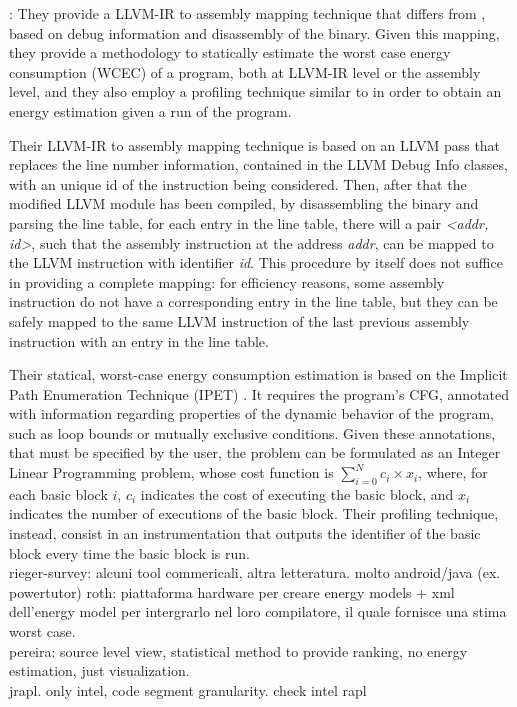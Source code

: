 \cite{eder}: They provide a LLVM-IR to assembly mapping technique that differs from \cite{brando2011}, based on debug information and disassembly of the binary. Given this mapping, they provide a methodology to statically estimate the worst case energy consumption (WCEC) of a program, both at LLVM-IR level or the assembly level, and they also employ a profiling technique similar to \cite{brando2011} in order to obtain an energy estimation given a run of the program. \par 
Their LLVM-IR to assembly mapping technique is based on an LLVM pass that replaces the line number information, contained in the LLVM Debug Info classes, with an unique id of the instruction being considered. Then, after that the modified LLVM module has been compiled, by disassembling the binary and parsing the line table, for each entry in the line table, there will a pair \emph{<addr, id>}, such that the assembly instruction at the address \emph{addr}, can be mapped to the LLVM instruction with identifier \emph{id}.
\newline This procedure by itself does not suffice in providing a complete mapping: for efficiency reasons, some assembly instruction do not have a corresponding entry in the line table, but they can be safely mapped to the same LLVM instruction of the last previous assembly instruction with an entry in the line table. \par 
Their statical, worst-case energy consumption estimation is based on the Implicit Path Enumeration Technique (IPET) \cite{ipet}. It requires the program's CFG, annotated with information regarding properties of the dynamic behavior of the program, such as loop bounds or mutually exclusive conditions.
Given these annotations, that must be specified by the user, the problem can be formulated as an Integer Linear Programming problem, whose cost function is $\sum_{i=0}^{N} c_{i} \times x_{i}$, where, for each basic block $i$, $c_{i}$ indicates the cost of executing the basic block, and $x_{i}$ indicates the number of executions of the basic block. 
Their profiling technique, instead, consist in an instrumentation that outputs the identifier of the basic block every time the basic block is run. \\[1in]


rieger-survey: alcuni tool commericali, altra letteratura. molto android/java (ex. powertutor)
roth: piattaforma hardware per creare energy models + xml dell'energy model per intergrarlo nel loro compilatore, il quale fornisce una stima worst case. \\
pereira: source level view, statistical method to provide ranking, no energy estimation, just visualization. \\
jrapl. only intel, code segment granularity. check intel rapl 


